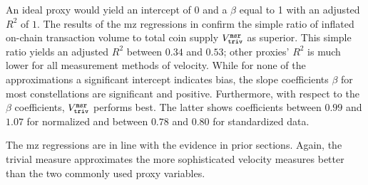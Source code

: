 An ideal proxy would yield an intercept of 0 and a $\beta$ equal to 1 with an
adjusted $R^{2}$ of $1$.  %
The results of the \ac{mz} regressions in  confirm the
simple ratio of inflated on-chain transaction volume to total coin supply
${V_{\mathtt{triv}}^{\mathtt{msr}}}$ as superior.  %
This simple ratio yields an adjusted $R^{2}$ between $0.34$ and $0.53$; other
proxies' $R^{2}$ is much lower for all measurement methods of velocity.  %
While for none of the approximations a significant intercept indicates bias,
the slope coefficients $\beta$ for most constellations are significant and
positive.  %
Furthermore, with respect to the $\beta$ coefficients, ${V_{\mathtt{triv}}^{\mathtt{msr}}}$ performs
best.  %
The latter shows coefficients between $0.99$ and $1.07$ for normalized and
between $0.78$ and $0.80$ for standardized data.  %

The \ac{mz} regressions are in line with the evidence in prior sections.  %
Again, the trivial measure approximates the more sophisticated velocity
measures better than the two commonly used proxy variables.  %



% 
%
%